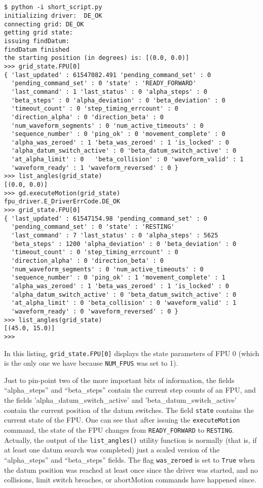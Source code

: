 \documentclass{scrartcl}[12pt,a4paper]
\begin{document}
\begin{verbatim}

  
$ python -i short_script.py
initializing driver:  DE_OK
connecting grid: DE_OK
getting grid state:
issuing findDatum:
findDatum finished
the starting position (in degrees) is: [(0.0, 0.0)]
>>> grid_state.FPU[0]
{ 'last_updated' : 61547082.491 'pending_command_set' : 0
  'pending_command_set' : 0 'state' : 'READY_FORWARD'
  'last_command' : 1 'last_status' : 0 'alpha_steps' : 0
  'beta_steps' : 0 'alpha_deviation' : 0 'beta_deviation' : 0
  'timeout_count' : 0 'step_timing_errcount' : 0
  'direction_alpha' : 0 'direction_beta' : 0
  'num_waveform_segments' : 0 'num_active_timeouts' : 0
  'sequence_number' : 0 'ping_ok' : 0 'movement_complete' : 0
  'alpha_was_zeroed' : 1 'beta_was_zeroed' : 1 'is_locked' : 0
  'alpha_datum_switch_active' : 0 'beta_datum_switch_active' : 0
  'at_alpha_limit' : 0   'beta_collision' : 0 'waveform_valid' : 1
  'waveform_ready' : 1 'waveform_reversed' : 0 }
>>> list_angles(grid_state)
[(0.0, 0.0)]
>>> gd.executeMotion(grid_state)
fpu_driver.E_DriverErrCode.DE_OK
>>> grid_state.FPU[0]
{ 'last_updated' : 61547154.98 'pending_command_set' : 0
  'pending_command_set' : 0 'state' : 'RESTING'
  'last_command' : 7 'last_status' : 0 'alpha_steps' : 5625
  'beta_steps' : 1200 'alpha_deviation' : 0 'beta_deviation' : 0
  'timeout_count' : 0 'step_timing_errcount' : 0
  'direction_alpha' : 0 'direction_beta' : 0
  'num_waveform_segments' : 0 'num_active_timeouts' : 0
  'sequence_number' : 0 'ping_ok' : 1 'movement_complete' : 1
  'alpha_was_zeroed' : 1 'beta_was_zeroed' : 1 'is_locked' : 0
  'alpha_datum_switch_active' : 0 'beta_datum_switch_active' : 0
  'at_alpha_limit' : 0 'beta_collision' : 0 'waveform_valid' : 1
  'waveform_ready' : 0 'waveform_reversed' : 0 }
>>> list_angles(grid_state)
[(45.0, 15.0)]
>>>
\end{verbatim}

In this listing, \verb+grid_state.FPU[0]+ displays the state parameters of
FPU 0 (which is the only one we have because \texttt{NUM\_FPUS} was
set to 1).

Just to pin-point two of the more important bits of information, the
fields ``alpha\_steps'' and ``beta\_steps'' contain the current step
counts of an FPU, and the fields 'alpha\_datum\_switch\_active' and
'beta\_datum\_switch\_active' contain the current position of the
datum switches. The field \texttt{state} contains the current state of
the FPU. One can see that after issuing the \texttt{executeMotion}
command, the state of the FPU changes from \texttt{READY\_FORWARD} to
\texttt{RESTING}. Actually, the output of the \texttt{list\_angles()}
utility function is normally (that is, if at least one datum search
was completed) just a scaled version of the ``alpha\_steps'' and
``beta\_steps'' fields. The flag \texttt{was\_zeroed} is set to
\texttt{True} when the datum position was reached at least once since
the driver was started, and no collisions, limit switch breaches, or
abortMotion commands have happened since.
\end{document}
